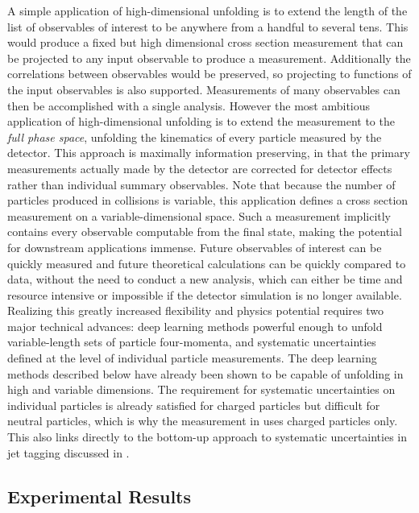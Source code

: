 A simple application of high-dimensional unfolding is to extend the length of the list of observables of interest to be anywhere from a handful to several tens.
This would produce a fixed but high dimensional cross section measurement that can be projected to any input observable to produce a measurement.
Additionally the correlations between observables would be preserved, so projecting to functions of the input observables is also supported.
Measurements of many observables can then be accomplished with a single analysis.
However the most ambitious application of high-dimensional unfolding is to extend the measurement to the \textit{full phase space}, unfolding the kinematics of every particle measured by the detector.
This approach is maximally information preserving, in that the primary measurements actually made by the detector are corrected for detector effects rather than individual summary observables.
Note that because the number of particles produced in collisions is variable, this application defines a cross section measurement on a variable-dimensional space.
Such a measurement implicitly contains every observable computable from the final state, making the potential for downstream applications immense.
Future observables of interest can be quickly measured and future theoretical calculations can be quickly compared to data, without the need to conduct a new analysis, which can either be time and resource intensive or impossible if the detector simulation is no longer available.
Realizing this greatly increased flexibility and physics potential requires two major technical advances: deep learning methods powerful enough to unfold variable-length sets of particle four-momenta, and systematic uncertainties defined at the level of individual particle measurements.
The deep learning methods described below have already been shown to be capable of unfolding in high and variable dimensions.
The requirement for systematic uncertainties on individual particles is already satisfied for charged particles but difficult for neutral particles, which is why the measurement in  uses charged particles only.
This also links directly to the bottom-up approach to systematic uncertainties in jet tagging discussed in .

\subsection{Experimental Results}
\label{sec:unbinned-experimental-results}

